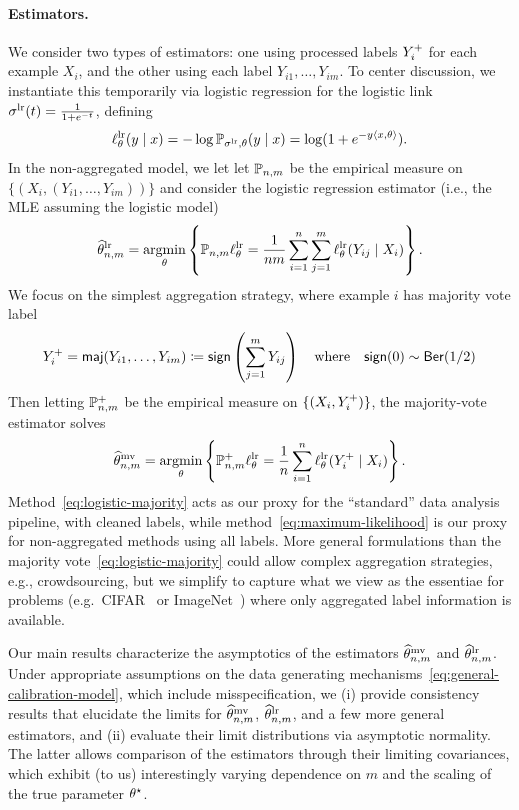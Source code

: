 \paragraph{Estimators.}
We consider two types of estimators: one
using processed labels $Y^+_i$ for each
example $X_i$, and the other
using each label $Y_{i1}, \ldots, Y_{im}$.
%
To center discussion, we instantiate this temporarily via logistic
regression for the logistic link $\sigma^{\textup{lr}}(t) = \frac{1}{1 + e^{-t}}$,
defining
\begin{align*}
  \ell_\theta^{\textup{lr}}(y \mid x) = -\log \mathbb{P}_{\sigma^{\textup{lr}}, \theta}(y \mid x)
  = \log(1 + e^{-y\langle x,\theta\rangle})  .
\end{align*}
In the non-aggregated model, we let let $\mathbb{P}_{n,m}$ be the empirical
measure on $\{(X_i, (Y_{i1},\dots,Y_{im}))\}$ and consider the logistic
regression estimator (i.e., the MLE assuming the logistic model)
\begin{align}
  \label{eq:maximum-likelihood}
  \widehat{\theta}^{\textup{lr}}_{n,m} = \operatorname*{argmin}_\theta \left\{\mathbb{P}_{n,m} \ell_\theta^{\textup{lr}}
  = \frac{1}{nm} \sum_{i = 1}^n \sum_{j = 1}^m \ell_\theta^{\textup{lr}}(Y_{ij} \mid X_i)
  \right\}.
\end{align}
We focus on the simplest
aggregation strategy, where example $i$ has majority vote label
\begin{align*}
  Y^+_i = \mathsf{maj}(Y_{i1}, \ldots, Y_{im})
  \coloneqq \mathsf{sign}\left(\sum_{j=1}^m Y_{ij}\right)
  ~~~\mbox{where}~~~
  \mathsf{sign}(0) \sim \mathsf{Ber}(1/2)
\end{align*}
Then letting ${\mathbb{P}}^+_{n,m}$ be the empirical measure on
$\{(X_i, Y^+_i)\}$, the majority-vote estimator solves
\begin{align}
  \label{eq:logistic-majority}
  \widehat{\theta}^{\textup{mv}}_{n,m} = \operatorname*{argmin}_\theta  \left\{{{\mathbb{P}}^+_{n,m}\ell_\theta^{\textup{lr}} = \frac 1 n \sum_{i=1}^n  \ell_\theta^{\textup{lr}}(Y^+_i \mid X_i)}\right\}.
\end{align}
Method~\eqref{eq:logistic-majority} acts as our proxy for the ``standard''
data analysis pipeline, with cleaned labels, while
method~\eqref{eq:maximum-likelihood} is our proxy for non-aggregated methods
using all labels.
%
More general formulations than the majority
vote~\eqref{eq:logistic-majority} could allow complex aggregation
strategies, e.g., crowdsourcing, but we simplify to capture what we view as
the essentiae for problems (e.g.\ CIFAR~\cite{KrizhevskyHi09} or
ImageNet~\cite{RussakovskyDeSuKrSaMaHuKaKhBeBeFe15}) where only aggregated
label information is available.

Our main results characterize the
asymptotics of the
estimators $\widehat{\theta}^{\textup{mv}}_{n,m}$ and $\widehat{\theta}^{\textup{lr}}_{n,m}$.
%
Under
appropriate assumptions on the data generating
mechanisms~\eqref{eq:general-calibration-model}, which include
misspecification, we (i) provide consistency results that elucidate the
limits for $\widehat{\theta}^{\textup{mv}}_{n,m}$, $\widehat{\theta}^{\textup{lr}}_{n,m}$, and a few more general
estimators, and (ii) evaluate their limit distributions via
asymptotic normality. The latter allows comparison
of the estimators through their limiting covariances, which
exhibit (to us) interestingly varying dependence on $m$ and the scaling of
the true parameter $\theta^\star$.

